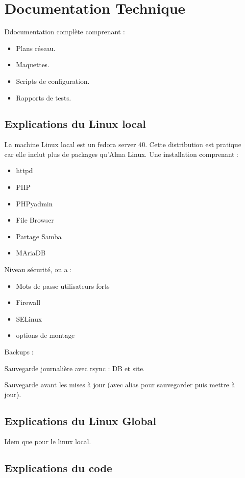 \documentclass[a4paper,12pt]{report}
\begin{document}
\chapter{Documentation Technique}
Ddocumentation complète comprenant :
\begin{itemize}
    \item Plans réseau.
    \item Maquettes.
    \item Scripts de configuration.
    \item Rapports de tests.
\end{itemize}

\section{Explications du Linux local}

La machine Linux local est un fedora server 40. 
Cette distribution est pratique car elle inclut plus de packages qu'Alma Linux.
Une installation comprenant :

\begin{itemize}
\item httpd
\item PHP
\item PHPyadmin
\item File Browser
\item Partage Samba
\item MAriaDB
\end{itemize}

Niveau sécurité, on a :
\begin{itemize}
\item Mots de passe utilisateurs forts 
\item Firewall
\item SELinux
\item options de montage 
\end{itemize}

Backups : 

Sauvegarde journalière avec rsync : DB et site.

Sauvegarde avant les mises à jour (avec alias pour sauvegarder puis mettre à jour).

\section{Explications du Linux Global}

Idem que pour le linux local.

\section{Explications du code}
\end{document}
